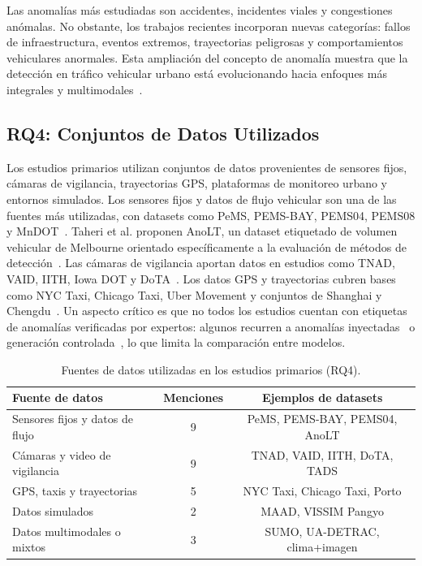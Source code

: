 \documentclass[12pt, a4paper]{article}
\begin{document}
\begin{hallazgo}[]
Las anomal\'{i}as m\'{a}s estudiadas son accidentes, incidentes viales y congestiones an\'{o}malas. No obstante, los trabajos recientes incorporan nuevas categor\'{i}as: fallos de infraestructura, eventos extremos, trayectorias peligrosas y comportamientos vehiculares anormales. Esta ampliaci\'{o}n del concepto de anomal\'{i}a muestra que la detecci\'{o}n en tr\'{a}fico vehicular urbano est\'{a} evolucionando hacia enfoques m\'{a}s integrales y multimodales~\cite{abdallah2025aipurban,duan2025multimodal}.
\end{hallazgo}

\subsection{RQ4: Conjuntos de Datos Utilizados}

Los estudios primarios utilizan conjuntos de datos provenientes de sensores fijos, c\'{a}maras de vigilancia, trayectorias GPS, plataformas de monitoreo urbano y entornos simulados. Los sensores fijos y datos de flujo vehicular son una de las fuentes m\'{a}s utilizadas, con datasets como PeMS, PEMS-BAY, PEMS04, PEMS08 y MnDOT~\cite{fang2020deep,mehrannia2023deep,jia2025prediction}. Taheri et al. proponen AnoLT, un dataset etiquetado de volumen vehicular de Melbourne orientado espec\'{i}ficamente a la evaluaci\'{o}n de m\'{e}todos de detecci\'{o}n~\cite{taheri2026applicability}. Las c\'{a}maras de vigilancia aportan datos en estudios como TNAD, VAID, IITH, Iowa DOT y DoTA~\cite{huang2020intelligent,khan2022anomaly,pawar2022deep}. Los datos GPS y trayectorias cubren bases como NYC Taxi, Chicago Taxi, Uber Movement y conjuntos de Shanghai y Chengdu~\cite{hu2022detecting,wang2024multiscale,cai2021road}. Un aspecto cr\'{i}tico es que no todos los estudios cuentan con etiquetas de anomal\'{i}as verificadas por expertos: algunos recurren a anomal\'{i}as inyectadas~\cite{ren2024graph} o generaci\'{o}n controlada~\cite{wang2024multiscale}, lo que limita la comparaci\'{o}n entre modelos.

\begin{table}[H]
\centering
\caption{Fuentes de datos utilizadas en los estudios primarios (RQ4).}
\label{tab:rq4}
\small
\begin{tabularx}{\linewidth}{Xcc}
\toprule
\textbf{Fuente de datos} & \textbf{Menciones} & \textbf{Ejemplos de datasets} \\
\midrule
Sensores fijos y datos de flujo         & 9 & PeMS, PEMS-BAY, PEMS04, AnoLT \\
C\'{a}maras y video de vigilancia       & 9 & TNAD, VAID, IITH, DoTA, TADS \\
GPS, taxis y trayectorias               & 5 & NYC Taxi, Chicago Taxi, Porto \\
Datos simulados                         & 2 & MAAD, VISSIM Pangyo \\
Datos multimodales o mixtos             & 3 & SUMO, UA-DETRAC, clima+imagen \\
\bottomrule
\end{tabularx}
\end{table}
\end{document}
